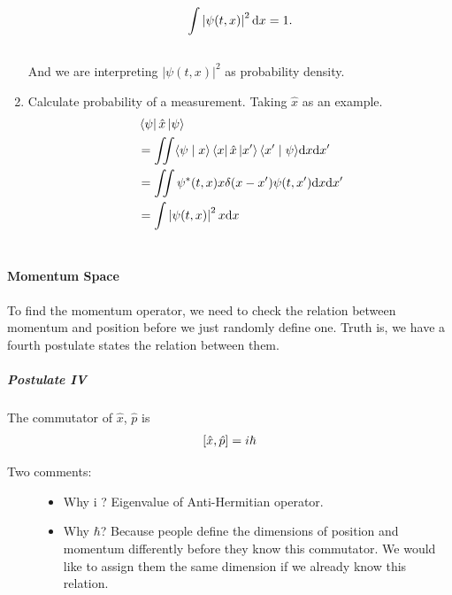 \documentclass[letterpaper,10pt,english]{sphinxmanual}
\def\d{{\rm d}}
\newcommand{\bra}[1]{\left\langle #1\right|}
\newcommand{\ket}[1]{\left| #1\right\rangle}
\newcommand{\braket}[2]{\langle #1 \mid #2 \rangle}
\begin{document}
\begin{enumerate}
\begin{itemize}
\end{itemize}
\begin{gather}
\begin{split}\int \left| \psi(t,x) \right|^2 \d x = 1.\end{split}\notag\\\begin{split}\end{split}\notag
\end{gather}
And we are interpreting $\left| \psi(t, x)\right|^2$ as probability density.

\item {} 
Calculate probability of a measurement. Taking $\hat x$ as an example.
\begin{gather}
\begin{split}&\bra{\psi} \hat x \ket{\psi} \\
&= \iint \braket{\psi}{x}\bra{x} \hat x \ket{x'} \braket{x'}{\psi}  \d x \d x' \\
&= \iint  \psi^ * (t,x) x\delta(x-x') \psi(t,x')  \d x \d x'  \\
&= \int \left| \psi(t,x) \right|^2 x \d x\end{split}\notag\\\begin{split}\end{split}\notag
\end{gather}
\end{enumerate}


\paragraph{Momentum Space}
\label{QuantumMechanics:momentum-space}
To find the momentum operator, we need to check the relation between momentum and position before we just randomly define one. Truth is, we have a fourth postulate states the relation between them.


\subparagraph{Postulate IV}
\label{QuantumMechanics:postulate-iv}
The commutator of $\hat x$, $\hat p$ is
\begin{gather}
\begin{split}\left[ \hat x, \hat p \right] = i \hbar\end{split}\notag
\end{gather}\begin{description}
\item[{Two comments:}] \leavevmode\begin{itemize}
\item {} 
Why i ? Eigenvalue of Anti-Hermitian operator.

\item {} 
Why $\hbar$? Because people define the dimensions of position and momentum differently before they know this commutator. We would like to assign them the same dimension if we already know this relation.

\end{itemize}

\end{description}
\end{document}
